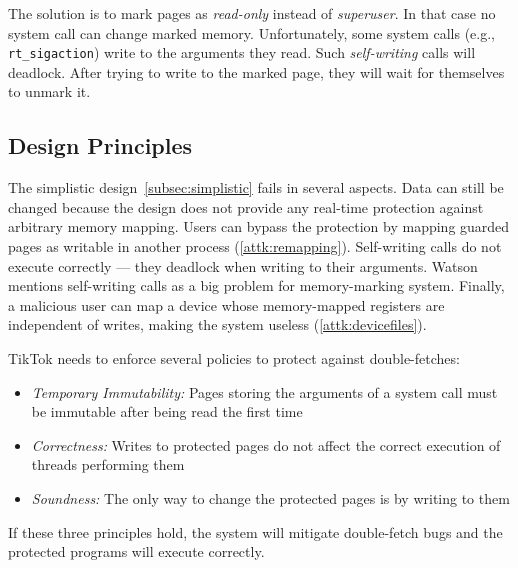 \documentclass[conference]{IEEEtran}
\newcommand{\mat}[1]{\textcolor{red}{\textbf{Mat:} #1}}
\newcommand{\sysname}{TikTok}
\begin{document}
The solution is to mark pages as \emph{read-only} instead of \emph{superuser}.
In that case no system call can change marked memory. Unfortunately, some system
calls (e.g., \texttt{rt\_sigaction}) write to the arguments they read. Such
\emph{self-writing} calls will deadlock. After trying to write to the marked
page, they will wait for themselves to unmark it.

\subsection{Design Principles}
\label{subsec:designprinciples}

The simplistic design~\autoref{subsec:simplistic} fails in several aspects. Data
can still be changed because the design does not provide any real-time
protection against arbitrary memory mapping. Users can bypass the protection by
mapping guarded pages as writable in another process (\autoref{attk:remapping}).
Self-writing calls do not execute correctly --- they deadlock when writing to
their arguments. Watson~\cite{watson2007exploiting} mentions self-writing calls
as a big problem for memory-marking system. Finally, a malicious user can map a
device whose memory-mapped registers are independent of writes, making the
system useless (\autoref{attk:devicefiles}).

\sysname{} needs to enforce several policies to protect against double-fetches:

\begin{itemize}
  \item \label{policy:immutability} \emph{Temporary Immutability:} Pages storing
  the arguments of a system call must be immutable after being read the first
  time
  \item \label{policy:correctness} \emph{Correctness:} Writes to protected pages
  do not affect the correct execution of threads performing them
  \item \label{policy:soundness} \emph{Soundness:} The only way to change the
  protected pages is by writing to them
\end{itemize}



If these three principles hold, the system will mitigate double-fetch bugs and
the protected programs will execute correctly.
\end{document}
